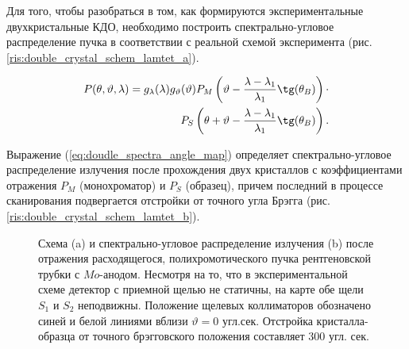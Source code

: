 
Для того, чтобы разобраться в том, как формируются экспериментальные
двухкристальные КДО, необходимо построить спектрально-угловое распределение пучка
в соответствии с реальной схемой эксперимента (рис. \ref{ris:double_crystal_schem_lamtet_a}).

\begin{eqnarray} \label{eq:doudle_spectra_angle_map}
  P(\theta,\vartheta,\lambda) = g_{\lambda}(\lambda)g_{\vartheta}(\vartheta) P_M \left(\vartheta - \frac{\lambda - \lambda_1}{\lambda_1}\tg(\theta_B) \right) \cdot \nonumber \\
   P_S \left(\theta + \vartheta - \frac{\lambda - \lambda_1}{\lambda_1}\tg(\theta_B)\right).
 \end{eqnarray}

Выражение (\ref{eq:doudle_spectra_angle_map}) определяет спектрально-угловое распределение излучения после прохождения двух кристаллов с
коэффициентами отражения  $P_M$ (монохроматор) и $P_S$ (образец), причем последний в процессе сканирования подвергается отстройки от точного угла Брэгга
 (рис. \ref{ris:double_crystal_schem_lamtet_b}).

\begin{figure}[H]
  \centering
  \hfill

  \caption{Схема (a) и спектрально-угловое распределение излучения (b) после
  отражения расходящегося, полихромотического пучка рентгеновской трубки с $Mo$-анодом.
  Несмотря на то, что в экспериментальной схеме детектор с приемной
   щелью не статичны, на карте обе щели $S_1$ и $S_2$ неподвижны.
  Положение щелевых коллиматоров обозначено синей и белой линиями
  вблизи $\vartheta = 0$ угл.сек. Отстройка кристалла-образца от
  точного брэгговского положения составляет 300 угл. сек. }
  \label{ris:double_crystal_schem_lamtet}
\end{figure}

